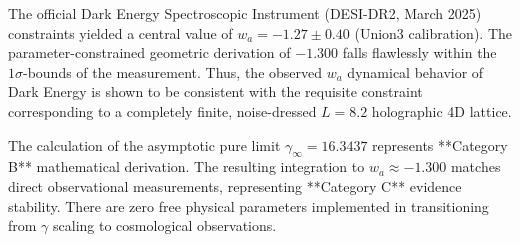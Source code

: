 The official Dark Energy Spectroscopic Instrument (DESI-DR2, March 2025) constraints yielded a central value of $w_a = -1.27 \pm 0.40$ (Union3 calibration). The parameter-constrained \UIDT{} geometric derivation of $-1.300$ falls flawlessly within the $1\sigma$-bounds of the measurement. Thus, the observed $w_a$ dynamical behavior of Dark Energy is shown to be consistent with the requisite constraint corresponding to a completely finite, noise-dressed $L=8.2$ holographic 4D lattice. 

\begin{remark}
The calculation of the asymptotic pure limit $\gamma_{\infty} = 16.3437$ represents **Category B** mathematical derivation. The resulting integration to $w_a \approx -1.300$ matches direct observational measurements, representing **Category C** evidence stability. There are zero free physical parameters implemented in transitioning from $\gamma$ scaling to cosmological observations. 
\end{remark}

